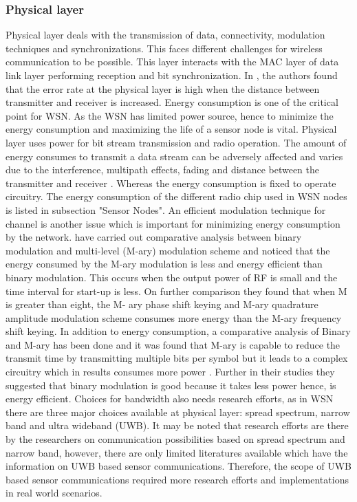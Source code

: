 \documentclass[12pt,journal,communications surveys and tutorials]{IEEEtran}
\begin{document}
\subsubsection{Physical layer}
Physical layer deals with the transmission of data, connectivity, modulation techniques and synchronizations. This faces different challenges for wireless communication to be possible. This layer interacts with the MAC layer of data link layer performing reception and bit synchronization. In \cite{akyildiz2006wireless}, the authors found that the error rate at the physical layer is high when the distance between transmitter and receiver is increased. Energy consumption is one of the critical point for WSN. As the WSN has limited power source, hence to minimize the energy consumption and maximizing the life of a sensor node is vital. Physical layer uses power for bit stream transmission and radio operation. The amount of energy consumes to transmit a data stream can be adversely affected and varies due to the interference, multipath effects, fading and distance between the transmitter and receiver \cite{akyildiz2006wireless}. Whereas the energy consumption is fixed to operate circuitry. The energy consumption of the different radio chip used in WSN nodes is listed in subsection "Sensor Nodes". An efficient modulation technique for channel is another issue which is important for minimizing energy consumption by the network. \cite{shih2001physical,wang2001energy} have carried out comparative analysis between binary modulation and multi-level (M-ary) modulation scheme and noticed that the energy consumed by the M-ary modulation is less and energy efficient than binary modulation. This occurs when the output power of RF is small and the time interval for start-up is less. On further comparison they found that when M is greater than eight, the M- ary phase shift keying and M-ary quadrature amplitude modulation scheme consumes more energy than the M-ary frequency shift keying. In addition to energy consumption, a comparative analysis of Binary and M-ary has been done and it was found that  M-ary is capable to reduce the transmit time by transmitting multiple bits per symbol but it leads to a complex circuitry which in results consumes more power \cite{daniels1996surface}. Further in their studies they suggested that binary modulation is good because it takes less power hence, is energy efficient. Choices for bandwidth also needs research efforts, as in WSN there are three major choices available at physical layer: spread spectrum, narrow band and ultra wideband (UWB). It may be noted that research efforts are there by the researchers on communication possibilities based on spread spectrum and narrow band, however, there are only limited literatures available which have the information on UWB based sensor communications. Therefore, the scope of UWB based sensor communications  required more research efforts and implementations in real world scenarios.
\end{document}
